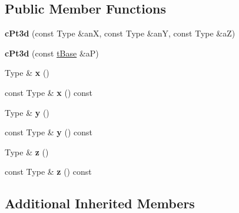 \subsection*{Public Member Functions}
\begin{DoxyCompactItemize}
\item 
{\bfseries c\+Pt3d} (const Type \&anX, const Type \&anY, const Type \&aZ)\hypertarget{classMMVII_1_1cPt3d_af4dec920d0da1ccec8986ab074de8255}{}\label{classMMVII_1_1cPt3d_af4dec920d0da1ccec8986ab074de8255}

\item 
{\bfseries c\+Pt3d} (const \hyperlink{classMMVII_1_1cPtxd}{t\+Base} \&aP)\hypertarget{classMMVII_1_1cPt3d_a08463cbdfc8c5cfa16f784158703897d}{}\label{classMMVII_1_1cPt3d_a08463cbdfc8c5cfa16f784158703897d}

\item 
Type \& {\bfseries x} ()\hypertarget{classMMVII_1_1cPt3d_a69bea3f4b76e30640756157fb5dc9935}{}\label{classMMVII_1_1cPt3d_a69bea3f4b76e30640756157fb5dc9935}

\item 
const Type \& {\bfseries x} () const \hypertarget{classMMVII_1_1cPt3d_ad1fb0173f423d86a007d34411ad1979a}{}\label{classMMVII_1_1cPt3d_ad1fb0173f423d86a007d34411ad1979a}

\item 
Type \& {\bfseries y} ()\hypertarget{classMMVII_1_1cPt3d_a1af55bcc35236b7adbe0148e13295eff}{}\label{classMMVII_1_1cPt3d_a1af55bcc35236b7adbe0148e13295eff}

\item 
const Type \& {\bfseries y} () const \hypertarget{classMMVII_1_1cPt3d_a007cc23779f29b7070de0a9e9dc96810}{}\label{classMMVII_1_1cPt3d_a007cc23779f29b7070de0a9e9dc96810}

\item 
Type \& {\bfseries z} ()\hypertarget{classMMVII_1_1cPt3d_a59f7629d22b4625f95b9992e377ce479}{}\label{classMMVII_1_1cPt3d_a59f7629d22b4625f95b9992e377ce479}

\item 
const Type \& {\bfseries z} () const \hypertarget{classMMVII_1_1cPt3d_ab93db42c5af0be77bc95d7014fd2bd64}{}\label{classMMVII_1_1cPt3d_ab93db42c5af0be77bc95d7014fd2bd64}

\end{DoxyCompactItemize}
\subsection*{Additional Inherited Members}


